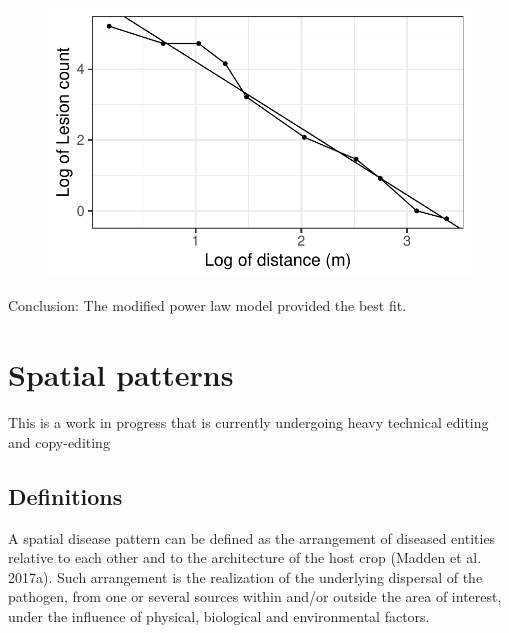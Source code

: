 \documentclass[
  letterpaper,
  DIV=11,
  numbers=noendperiod]{scrreprt}
\begin{document}
\begin{figure}[H]

{\centering \includegraphics{./spatial-fitting_files/figure-pdf/unnamed-chunk-18-1.pdf}

}

\end{figure}

Conclusion: The modified power law model provided the best fit.

\hypertarget{spatial-patterns}{%
\chapter{Spatial patterns}\label{spatial-patterns}}

\begin{tcolorbox}[enhanced jigsaw, rightrule=.15mm, left=2mm, breakable, colframe=quarto-callout-note-color-frame, toprule=.15mm, leftrule=.75mm, bottomrule=.15mm, colback=white, arc=.35mm, opacityback=0]
\begin{minipage}[t]{5.5mm}
\textcolor{quarto-callout-note-color}{\faInfo}
\end{minipage}%
\begin{minipage}[t]{\textwidth - 5.5mm}
This is a work in progress that is currently undergoing heavy technical
editing and copy-editing\end{minipage}%
\end{tcolorbox}

\hypertarget{definitions}{%
\section{Definitions}\label{definitions}}

A spatial disease pattern can be defined as the arrangement of diseased
entities relative to each other and to the architecture of the host crop
(Madden et al. 2017a). Such arrangement is the realization of the
underlying dispersal of the pathogen, from one or several sources within
and/or outside the area of interest, under the influence of physical,
biological and environmental factors.
\end{document}
